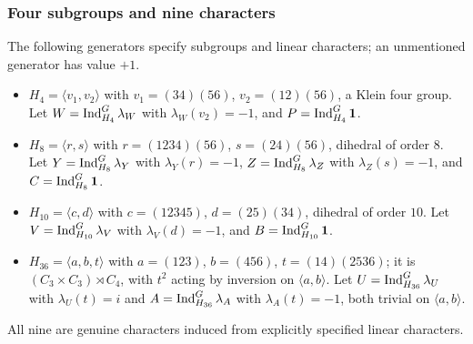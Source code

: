\subsubsection{Four subgroups and nine characters}
The following generators specify subgroups and linear characters; an
unmentioned generator has value $+1$.
\begin{itemize}
\item $H_4=\langle v_1,v_2\rangle$ with $v_1=(34)(56)$, $v_2=(12)(56)$, a Klein
four group. Let $W=\operatorname{Ind}_{H_4}^G\lambda_W$ with $\lambda_W(v_2)=-1$, and
$P=\operatorname{Ind}_{H_4}^G\mathbf{1}$.
\item $H_8=\langle r,s\rangle$ with $r=(1234)(56)$, $s=(24)(56)$, dihedral of
order $8$. Let $Y=\operatorname{Ind}_{H_8}^G\lambda_Y$ with $\lambda_Y(r)=-1$,
$Z=\operatorname{Ind}_{H_8}^G\lambda_Z$ with $\lambda_Z(s)=-1$, and $C=\operatorname{Ind}_{H_8}^G\mathbf{1}$.
\item $H_{10}=\langle c,d\rangle$ with $c=(12345)$, $d=(25)(34)$, dihedral of
order $10$. Let $V=\operatorname{Ind}_{H_{10}}^G\lambda_V$ with $\lambda_V(d)=-1$, and
$B=\operatorname{Ind}_{H_{10}}^G\mathbf{1}$.
\item $H_{36}=\langle a,b,t\rangle$ with $a=(123)$, $b=(456)$,
$t=(14)(2536)$; it is $(C_3\times C_3)\rtimes C_4$, with $t^2$ acting by
inversion on $\langle a,b\rangle$. Let $U=\operatorname{Ind}_{H_{36}}^G\lambda_U$ with
$\lambda_U(t)=i$ and $A=\operatorname{Ind}_{H_{36}}^G\lambda_A$ with $\lambda_A(t)=-1$, both
trivial on $\langle a,b\rangle$.
\end{itemize}
All nine are genuine characters induced from explicitly specified linear
characters.


